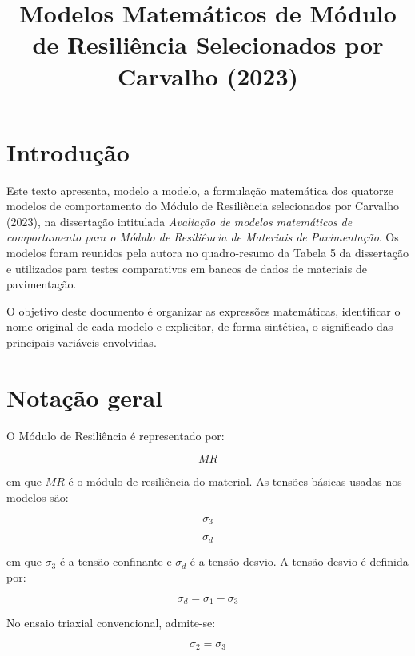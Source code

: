 \documentclass[12pt,a4paper]{article}
\title{Modelos Matemáticos de Módulo de Resiliência Selecionados por Carvalho (2023)}
\author{}
\date{}
\begin{document}
\maketitle

\section*{Introdução}

Este texto apresenta, modelo a modelo, a formulação matemática dos quatorze modelos de comportamento do Módulo de Resiliência selecionados por Carvalho (2023), na dissertação intitulada \textit{Avaliação de modelos matemáticos de comportamento para o Módulo de Resiliência de Materiais de Pavimentação}. Os modelos foram reunidos pela autora no quadro-resumo da Tabela 5 da dissertação e utilizados para testes comparativos em bancos de dados de materiais de pavimentação.

O objetivo deste documento é organizar as expressões matemáticas, identificar o nome original de cada modelo e explicitar, de forma sintética, o significado das principais variáveis envolvidas.

\section*{Notação geral}

O Módulo de Resiliência é representado por:

\begin{equation}
MR
\end{equation}

em que $MR$ é o módulo de resiliência do material. As tensões básicas usadas nos modelos são:

\begin{equation}
\sigma_3
\end{equation}

\begin{equation}
\sigma_d
\end{equation}

em que $\sigma_3$ é a tensão confinante e $\sigma_d$ é a tensão desvio. A tensão desvio é definida por:

\begin{equation}
\sigma_d=\sigma_1-\sigma_3
\end{equation}

No ensaio triaxial convencional, admite-se:

\begin{equation}
\sigma_2=\sigma_3
\end{equation}
\end{document}
